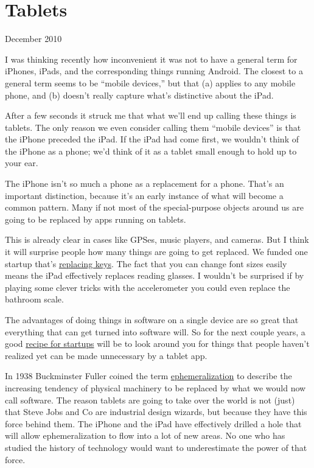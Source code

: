 \chapter{Tablets}

December 2010

I was thinking recently how inconvenient it was not to have a general
term for iPhones, iPads, and the corresponding things running Android.
The closest to a general term seems to be ``mobile devices,'' but that
(a) applies to any mobile phone, and (b) doesn't really capture what's
distinctive about the iPad.

After a few seconds it struck me that what we'll end up calling these
things is tablets. The only reason we even consider calling them
``mobile devices'' is that the iPhone preceded the iPad. If the iPad had
come first, we wouldn't think of the iPhone as a phone; we'd think of it
as a tablet small enough to hold up to your ear.

The iPhone isn't so much a phone as a replacement for a phone. That's an
important distinction, because it's an early instance of what will
become a common pattern. Many if not most of the special-purpose objects
around us are going to be replaced by apps running on tablets.

This is already clear in cases like GPSes, music players, and cameras.
But I think it will surprise people how many things are going to get
replaced. We funded one startup that's
\href{http://lockitron.com/}{replacing keys}. The fact that you can
change font sizes easily means the iPad effectively replaces reading
glasses. I wouldn't be surprised if by playing some clever tricks with
the accelerometer you could even replace the bathroom scale.

The advantages of doing things in software on a single device are so
great that everything that can get turned into software will. So for the
next couple years, a good \href{http://ycombinator.com/rfs8.html}{recipe
for startups} will be to look around you for things that people haven't
realized yet can be made unnecessary by a tablet app.

In 1938 Buckminster Fuller coined the term
\href{http://en.wikipedia.org/wiki/Ephemeralization}{ephemeralization}
to describe the increasing tendency of physical machinery to be replaced
by what we would now call software. The reason tablets are going to take
over the world is not (just) that Steve Jobs and Co are industrial
design wizards, but because they have this force behind them. The iPhone
and the iPad have effectively drilled a hole that will allow
ephemeralization to flow into a lot of new areas. No one who has studied
the history of technology would want to underestimate the power of that
force.

